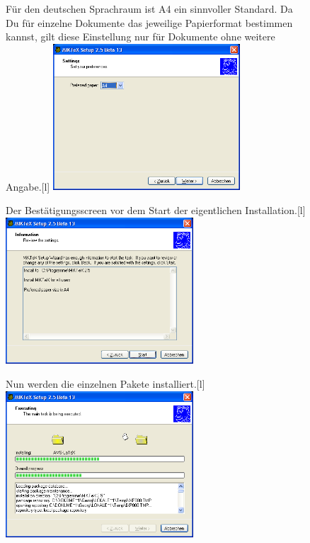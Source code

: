 \begin{figure}[hb]
	\begin{captionbeside}{Für den deutschen Sprachraum ist A4 ein sinnvoller Standard. Da Du für einzelne Dokumente das jeweilige Papierformat bestimmen kannst, gilt diese Einstellung nur für Dokumente ohne weitere Angabe.}[l]
		\includegraphics[width=7cm]{images/MiKTeX-install-04.png}
	\end{captionbeside}
	\label{fig:install04}
\end{figure}

\begin{figure}[th]
	\begin{captionbeside}{Der Bestätigungsscreen vor dem Start der eigentlichen Installation.}[l]
		\includegraphics[width=7cm]{images/MiKTeX-install-05.png}
	\end{captionbeside}
	\label{fig:install06}
\end{figure}

\begin{figure}[th]
	\begin{captionbeside}{Nun werden die einzelnen Pakete installiert.}[l]
		\includegraphics[width=7cm]{images/MiKTeX-install-07.png}
	\end{captionbeside}
	\label{fig:install07}
\end{figure}

